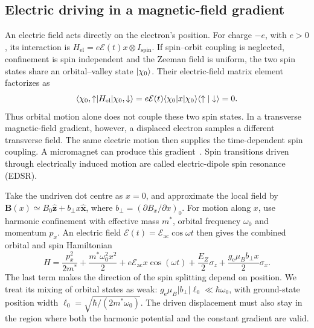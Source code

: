 \subsection{Electric driving in a magnetic-field gradient}
\label{sec:drive-magnetic-gradient}

An electric field acts directly on the electron's position. For
charge $-e$, with $e>0$, its interaction is
$H_{\mathrm{el}}=e\mathcal E(t)x\otimes I_{\mathrm{spin}}$.
If spin--orbit coupling is neglected, confinement is spin
independent and the Zeeman field is uniform, the two spin states
share an orbital--valley state
$\lvert \chi_0\rangle$. Their electric-field matrix element factorizes as
\begin{equation}
 \bra{\chi_0,\uparrow}H_{\mathrm{el}}\ket{\chi_0,\downarrow}
 =e\mathcal E(t)\bra{\chi_0}x\ket{\chi_0}
   \langle\uparrow|\downarrow\rangle=0.
 \label{eq:electric-selection-rule}
\end{equation}
Thus orbital motion alone does not couple these two spin states.
In a transverse magnetic-field gradient, however, a displaced
electron samples a different transverse field. The same electric
motion then supplies the time-dependent spin coupling. A
micromagnet can produce this gradient~\cite{PioroLadriere2006,Kawakami2014}.
Spin transitions driven through electrically induced motion are
called electric-dipole spin resonance (EDSR).

Take the undriven dot centre as $x=0$, and approximate the local
field by $\mathbf B(x)\simeq B_0\hat{\mathbf z}
+b_\perp x\hat{\mathbf x}$, where
$b_\perp=(\partial B_x/\partial x)_0$.
For motion along $x$, use harmonic confinement with effective
mass $m^*$, orbital frequency $\omega_0$ and momentum $p_x$.
An electric field $\mathcal E(t)=\mathcal E_{\mathrm{ac}}\cos\omega t$
then gives the combined orbital and spin Hamiltonian
\begin{equation}
 H=\frac{p_x^2}{2m^*}+\frac{m^*\omega_0^2x^2}{2}
   +e\mathcal E_{\mathrm{ac}}x\cos(\omega t)
   +\frac{E_Z}{2}\sigma_z
   +\frac{g_{\mathrm e}\mu_B b_\perp x}{2}\sigma_x.
 \label{eq:micromagnet-model}
\end{equation}
The last term makes the direction of the spin splitting depend
on position. We treat its mixing of orbital states as weak:
$g_{\mathrm e}\mu_B|b_\perp|\ell_0\ll\hbar\omega_0$, with
ground-state position width
$\ell_0=\sqrt{\hbar/(2m^*\omega_0)}$.
The driven displacement must also stay in the region where both
the harmonic potential and the constant gradient are valid.

